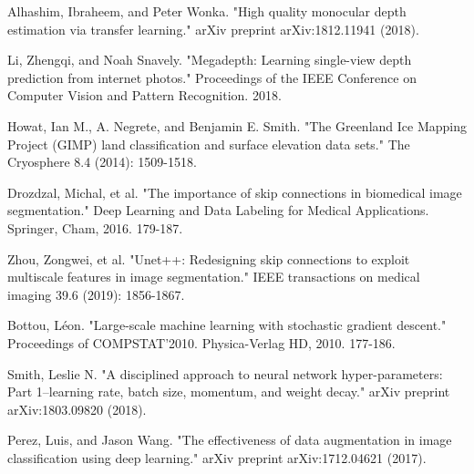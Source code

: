 \documentclass{article}
\begin{document}
\begin{thebibliography}{10}
 Alhashim, Ibraheem, and Peter Wonka. "High quality monocular depth estimation via transfer learning." arXiv preprint arXiv:1812.11941 (2018).

 Li, Zhengqi, and Noah Snavely. "Megadepth: Learning single-view depth prediction from internet photos." Proceedings of the IEEE Conference on Computer Vision and Pattern Recognition. 2018.

 Howat, Ian M., A. Negrete, and Benjamin E. Smith. "The Greenland Ice Mapping Project (GIMP) land classification and surface elevation data sets." The Cryosphere 8.4 (2014): 1509-1518.

 Drozdzal, Michal, et al. "The importance of skip connections in biomedical image segmentation." Deep Learning and Data Labeling for Medical Applications. Springer, Cham, 2016. 179-187.

 Zhou, Zongwei, et al. "Unet++: Redesigning skip connections to exploit multiscale features in image segmentation." IEEE transactions on medical imaging 39.6 (2019): 1856-1867.

 Bottou, Léon. "Large-scale machine learning with stochastic gradient descent." Proceedings of COMPSTAT'2010. Physica-Verlag HD, 2010. 177-186.

 Smith, Leslie N. "A disciplined approach to neural network hyper-parameters: Part 1--learning rate, batch size, momentum, and weight decay." arXiv preprint arXiv:1803.09820 (2018).

 Perez, Luis, and Jason Wang. "The effectiveness of data augmentation in image classification using deep learning." arXiv preprint arXiv:1712.04621 (2017).

\end{thebibliography}
\end{document}
